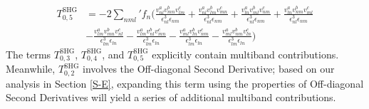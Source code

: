 \documentclass[twocolumn, prx, reprint, amsfonts, amsmath, amssymb, longbibliography, floatfix, aps]{revtex4-2}
\begin{document}
\begin{equation}
	\begin{aligned}
		T^{\text{SHG}}_{0, 5} &= -2 {\textstyle \sum_{nml}'} f_n \Big( \frac{v^{a}_{nl}v^b_{mn}v^c_{lm}}{\epsilon^3_{nl}\epsilon_{nm}} + \frac{v^{a}_{nl}v^b_{lm}v^c_{mn}}{\epsilon^3_{nl}\epsilon_{nm}} + 
		\frac{v^{a}_{ln}v^b_{ml}v^c_{nm}}{\epsilon^3_{nl}\epsilon_{nm}} + 
		\frac{v^{a}_{ln}v^b_{nm}v^c_{ml}}{\epsilon^3_{nl}\epsilon_{nm}}  \\
		&- \frac{v^{a}_{lm}v^b_{mn}v^c_{nl}}{\epsilon^3_{lm}\epsilon_{ln}} - \frac{v^{a}_{lm}v^b_{nl}v^c_{mn}}{\epsilon^3_{lm}\epsilon_{ln}} - 
		\frac{v^{a}_{ml}v^b_{ln}v^c_{nm}}{\epsilon^3_{lm}\epsilon_{ln}} - 
		\frac{v^{a}_{ml}v^b_{nm}v^c_{ln}}{\epsilon^3_{lm}\epsilon_{ln}}  \Big)
	\end{aligned}
\end{equation}
The terms $T^{\text{SHG}}_{0, 3}$, $T^{\text{SHG}}_{0, 4}$, and $T^{\text{SHG}}_{0, 5}$ explicitly contain multiband contributions. Meanwhile, $T^{\text{SHG}}_{0, 2}$ involves the Off-diagonal Second Derivative; based on our analysis in Section \ref{S-E}, expanding this term using the properties of Off-diagonal Second Derivatives will yield a series of additional multiband contributions.
\end{document}

